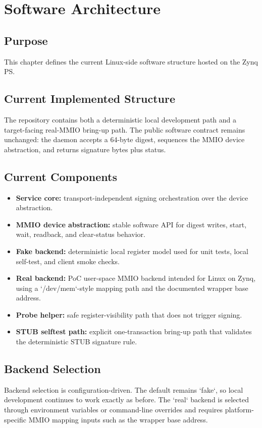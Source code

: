 \chapter{Software Architecture}

\section*{Purpose}
This chapter defines the current Linux-side software structure hosted on the Zynq PS.

\section{Current Implemented Structure}
The repository contains both a deterministic local development path and a target-facing real-MMIO bring-up path. The public software contract remains unchanged: the daemon accepts a 64-byte digest, sequences the MMIO device abstraction, and returns signature bytes plus status.

\section{Current Components}
\begin{itemize}[leftmargin=*]
  \item \textbf{Service core:} transport-independent signing orchestration over the device abstraction.
  \item \textbf{MMIO device abstraction:} stable software API for digest writes, start, wait, readback, and clear-status behavior.
  \item \textbf{Fake backend:} deterministic local register model used for unit tests, local self-test, and client smoke checks.
  \item \textbf{Real backend:} PoC user-space MMIO backend intended for Linux on Zynq, using a `/dev/mem`-style mapping path and the documented wrapper base address.
  \item \textbf{Probe helper:} safe register-visibility path that does not trigger signing.
  \item \textbf{STUB selftest path:} explicit one-transaction bring-up path that validates the deterministic STUB signature rule.
\end{itemize}

\section{Backend Selection}
Backend selection is configuration-driven. The default remains `fake`, so local development continues to work exactly as before. The `real` backend is selected through environment variables or command-line overrides and requires platform-specific MMIO mapping inputs such as the wrapper base address.

